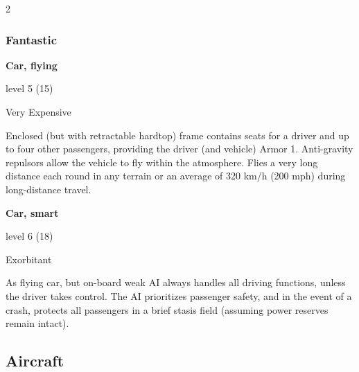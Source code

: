 \begin{multicols}{2}
\subsubsection{Fantastic}

\textbf{Car, flying} 

level 5 (15) 

Very Expensive 

Enclosed (but with retractable hardtop) frame contains seats for a driver and up to four other passengers, providing the driver (and vehicle) Armor 1. Anti-gravity repulsors allow the vehicle to fly within the atmosphere. Flies a very long distance each round in any terrain or an average of 320 km/h (200 mph) during long-distance travel. 

\textbf{Car, smart} 

level 6 (18) 

Exorbitant 

As flying car, but on-board weak AI always handles all driving functions, unless the driver takes control. The AI prioritizes passenger safety, and in the event of a crash, protects all passengers in a brief stasis field (assuming power reserves remain intact).

\newpage

\subsection{Aircraft}

\end{multicols}

